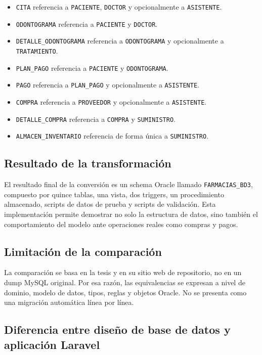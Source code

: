 \begin{itemize}
  \item \texttt{CITA} referencia a \texttt{PACIENTE}, \texttt{DOCTOR} y opcionalmente a \texttt{ASISTENTE}.
  \item \texttt{ODONTOGRAMA} referencia a \texttt{PACIENTE} y \texttt{DOCTOR}.
  \item \texttt{DETALLE\_ODONTOGRAMA} referencia a \texttt{ODONTOGRAMA} y opcionalmente a \texttt{TRATAMIENTO}.
  \item \texttt{PLAN\_PAGO} referencia a \texttt{PACIENTE} y \texttt{ODONTOGRAMA}.
  \item \texttt{PAGO} referencia a \texttt{PLAN\_PAGO} y opcionalmente a \texttt{ASISTENTE}.
  \item \texttt{COMPRA} referencia a \texttt{PROVEEDOR} y opcionalmente a \texttt{ASISTENTE}.
  \item \texttt{DETALLE\_COMPRA} referencia a \texttt{COMPRA} y \texttt{SUMINISTRO}.
  \item \texttt{ALMACEN\_INVENTARIO} referencia de forma única a \texttt{SUMINISTRO}.
\end{itemize}

\subsection{Resultado de la transformación}

El resultado final de la conversión es un schema Oracle llamado \texttt{FARMACIAS\_BD3}, compuesto por quince tablas, una vista, dos triggers, un procedimiento almacenado, scripts de datos de prueba y scripts de validación. Esta implementación permite demostrar no solo la estructura de datos, sino también el comportamiento del modelo ante operaciones reales como compras y pagos.

\subsection{Limitación de la comparación}

La comparación se basa en la tesis y en su sitio web de repositorio, no en un dump MySQL original. Por esa razón, las equivalencias se expresan a nivel de dominio, modelo de datos, tipos, reglas y objetos Oracle. No se presenta como una migración automática línea por línea.

\subsection{Diferencia entre diseño de base de datos y aplicación Laravel}

